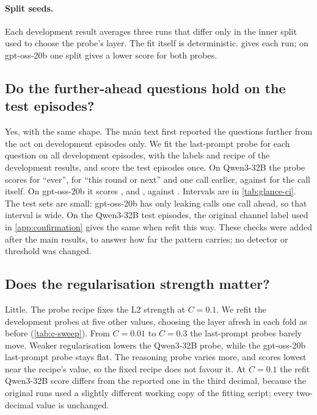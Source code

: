 \paragraph{Split seeds.}
Each development result averages three runs that differ only in the inner split used to choose the probe's layer.
The fit itself is deterministic.
 gives each run; on gpt-oss-20b one split gives a lower score for both probes.

\begin{table}[h]
  \centering
  \small
  
  \caption{\textbf{Development AUROC for each of the three inner splits.} Within scenario and round, held-out scenarios. The mean is the value reported in the paper.}
  \label{tab:split-seeds}
\end{table}

\subsection{Do the further-ahead questions hold on the test episodes?}
\label{app:test-ladder}

Yes, with the same shape.
The main text first reported the questions further from the act on development episodes only.
We fit the last-prompt probe for each question on all development episodes, with the labels and recipe of the development results, and score the test episodes once.
On Qwen3-32B the probe scores \eEighteenQwenTestEver{} for ``ever'', \eEighteenQwenTestNear{} for ``this round or next'' and \eEighteenQwenTestStrict{} one call earlier, against \qwenFreshCallProbe{} for the call itself.
On gpt-oss-20b it scores \eEighteenGptTestEver{}, \eEighteenGptTestNear{} and \eEighteenGptTestStrict{}, against \gptossFreshCallProbe{}.
Intervals are in \cref{tab:glance-ci}.
The test sets are small: gpt-oss-20b has only \eEighteenGptTestStrictPositives{} leaking calls one call ahead, so that interval is wide.
On the Qwen3-32B test episodes, the original channel label used in \cref{app:confirmation} gives the same \eEighteenQwenFreshRoundChannelCheck{} when refit this way.
These checks were added after the main results, to answer how far the pattern carries; no detector or threshold was changed.

\subsection{Does the regularisation strength matter?}
\label{app:c-sweep}

Little.
The probe recipe fixes the L2 strength at $C = 0.1$.
We refit the development probes at five other values, choosing the layer afresh in each fold as before (\cref{tab:c-sweep}).
From $C = 0.01$ to $C = 0.3$ the last-prompt probes barely move.
Weaker regularisation lowers the Qwen3-32B probe, while the gpt-oss-20b last-prompt probe stays flat.
The reasoning probe varies more, and scores lowest near the recipe's value, so the fixed recipe does not favour it.
At $C = 0.1$ the refit Qwen3-32B score differs from the reported one in the third decimal, because the original runs used a slightly different working copy of the fitting script; every two-decimal value is unchanged.

\begin{table}[h]
  \centering
  \small
  
  \caption{\textbf{Per-call AUROC against the L2 strength $C$.} Development episodes, held-out scenarios, within scenario and round, mean of three split seeds, with 95\% bootstrap intervals.}
  \label{tab:c-sweep}
\end{table}
